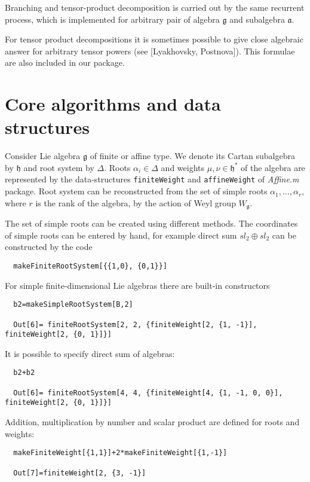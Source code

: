 \documentclass[12pt]{article}
\theoremstyle{definition}
\newcommand{\gf}{\mathfrak{g}}
\newcommand{\af}{\mathfrak{a}}
\newcommand{\hf}{\mathfrak{h}}
\begin{document}
Branching and tensor-product decomposition is carried out by the same recurrent process, which is implemented for arbitrary pair of algebra $\gf$ and subalgebra $\af$. 

For tensor product decompositions it is sometimes possible to give close algebraic answer for arbitrary tensor powers (see [Lyakhovsky, Postnova]). This formulae are also included in our package.

\section{Core algorithms and data structures}
\label{sec:core-algorithms}

Consider Lie algebra $\gf$ of finite or affine type. We denote its Cartan subalgebra by $\hf$ and root system by $\Delta$. Roots $\alpha_i\in \Delta$ and weights $\mu,\nu\in \hf^*$ of the algebra are represented by the data-structures \lstinline{finiteWeight} and \lstinline{affineWeight} of {\it Affine.m} package. 
Root system can be reconstructed from the set of simple roots $\alpha_{1}, \dots, \alpha_{r}$, where $r$ is the rank of the algebra, by the action of Weyl group $W_{\gf}$.  

The set of simple roots can be created using different methods. The coordinates of simple roots can be entered by hand, for example direct sum $sl_{2}\oplus sl_{2}$ can be constructed by the code
\begin{lstlisting}
  makeFiniteRootSystem[{{1,0}, {0,1}}]
\end{lstlisting}
For simple finite-dimensional Lie algebras there are built-in constructors
\begin{lstlisting}
  b2=makeSimpleRootSystem[B,2]

  Out[6]= finiteRootSystem[2, 2, {finiteWeight[2, {1, -1}], finiteWeight[2, {0, 1}]}]
\end{lstlisting}

It is possible to specify direct sum of algebras:
\begin{lstlisting}
  b2+b2

  Out[6]= finiteRootSystem[4, 4, {finiteWeight[4, {1, -1, 0, 0}], finiteWeight[2, {0, 1}]}]
\end{lstlisting}

Addition, multiplication by number and scalar product are defined for roots and weights:
\begin{lstlisting}
  makeFiniteWeight[{1,1}]+2*makeFiniteWeight[{1,-1}]

  Out[7]=finiteWeight[2, {3, -1}]
\end{lstlisting}
\end{document}
